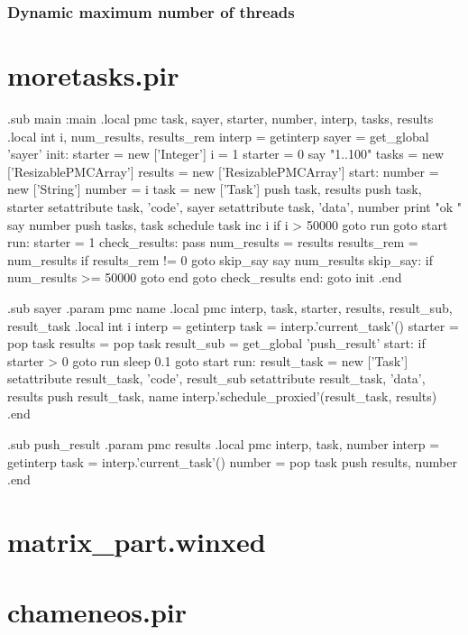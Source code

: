 \documentclass[bachelor,english]{hgbthesis}
\begin{document}
\subsection{Dynamic maximum number of threads}

\appendix
\chapter{moretasks.pir}
\label{app:moretasks}

\begin{GenericCode}
.sub main :main
    .local pmc task, sayer, starter, number, interp, tasks, results
    .local int i, num_results, results_rem
    interp = getinterp
    sayer = get_global 'sayer'
init:
    starter = new ['Integer']
    i = 1
    starter = 0
    say "1..100"
    tasks = new ['ResizablePMCArray']
    results = new ['ResizablePMCArray']
start:
    number = new ['String']
    number = i
    task = new ['Task']
    push task, results
    push task, starter
    setattribute task, 'code', sayer
    setattribute task, 'data', number
    print "ok "
    say number
    push tasks, task
    schedule task
    inc i
    if i > 50000 goto run
    goto start
run:
    starter = 1
check_results:
    pass
    num_results = results
    results_rem = num_results %
    if results_rem != 0 goto skip_say
    say num_results
skip_say:
    if num_results >= 50000 goto end
    goto check_results
end:
    goto init
.end

.sub sayer
    .param pmc name
    .local pmc interp, task, starter, results, result_sub, result_task
    .local int i
    interp = getinterp
    task = interp.'current_task'()
    starter    = pop task
    results    = pop task
    result_sub = get_global 'push_result'
start:
    if starter > 0 goto run
    sleep 0.1
    goto start
run:
    result_task = new ['Task']
    setattribute result_task, 'code', result_sub
    setattribute result_task, 'data', results
    push result_task, name
    interp.'schedule_proxied'(result_task, results)
.end

.sub push_result
    .param pmc results
    .local pmc interp, task, number
    interp = getinterp
    task = interp.'current_task'()
    number = pop task
    push results, number
.end
\end{GenericCode}

\chapter{matrix\_part.winxed}
\label{app:matrix_part}



\chapter{chameneos.pir}
\label{app:chameneos_part}





\end{document}
